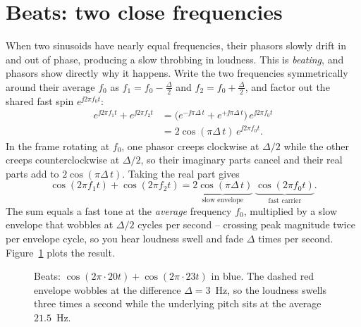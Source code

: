 \section{Beats: two close frequencies}

When two sinusoids have nearly equal frequencies, their phasors slowly drift in and out of
phase, producing a slow throbbing in loudness. This is \emph{beating}, and phasors show directly why it happens. Write the two frequencies symmetrically around their average $f_0$ as $f_1 = f_0 - \tfrac{\Delta}{2}$ and $f_2 = f_0 + \tfrac{\Delta}{2}$, and factor out the shared fast spin $e^{\jj 2\pi f_0 t}$:
\begin{align*}
  e^{\jj 2\pi f_1 t} + e^{\jj 2\pi f_2 t}
  &= \bigl(e^{-\jj\pi\Delta\, t} + e^{+\jj\pi\Delta\, t}\bigr)\,e^{\jj 2\pi f_0 t} \\
  &= 2\cos(\pi\Delta\, t)\,e^{\jj 2\pi f_0 t}.
\end{align*}
In the frame rotating at $f_0$, one phasor creeps clockwise at $\Delta/2$ while the other creeps counterclockwise at $\Delta/2$, so their imaginary parts cancel and their real parts add to $2\cos(\pi\Delta\, t)$. Taking the real part gives
\[
  \cos(2\pi f_1 t) + \cos(2\pi f_2 t)
  = \underbrace{2\cos(\pi \Delta\, t)}_{\text{slow envelope}}\;
    \underbrace{\cos(2\pi f_0 t)}_{\text{fast carrier}} .
\]
The sum equals a fast tone at the \emph{average} frequency $f_0$, multiplied by a
slow envelope that wobbles at $\Delta/2$ cycles per second -- crossing peak magnitude twice per envelope cycle, so you hear loudness swell and fade $\Delta$ times per second. Figure~\ref{ch05:beats}
plots the result.

\begin{figure}[H]
\centering
{}
\caption{Beats: $\cos(2\pi\cdot 20 t)+\cos(2\pi\cdot 23 t)$ in blue. The dashed red
envelope wobbles at the difference $\Delta = 3$~Hz, so the loudness swells three
times a second while the underlying pitch sits at the average $21.5$~Hz.}
\label{ch05:beats}
\end{figure}


